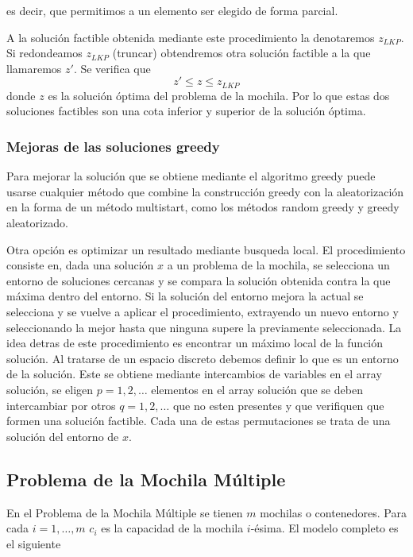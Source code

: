 \noindent es decir, que permitimos a un elemento ser elegido de forma parcial.

\newpage

A la solución factible obtenida mediante este procedimiento la denotaremos $z_{LKP}$. Si redondeamos $z_{LKP}$ (truncar)
obtendremos otra solución factible a la que llamaremos $z'$. Se verifica que
\[
    z' \leq z \leq z_{LKP}
\]
donde $z$ es la solución óptima del problema de la mochila. Por lo que estas dos soluciones factibles son una cota inferior
y superior de la solución óptima.

\subsubsection{Mejoras de las soluciones greedy}

Para mejorar la solución que se obtiene mediante el algoritmo greedy puede usarse cualquier método que combine la 
construcción greedy con la aleatorización en la forma de un método multistart, como los métodos random greedy y greedy 
aleatorizado.

Otra opción es optimizar un resultado mediante busqueda local. El procedimiento consiste en, dada una solución $x$ a un
problema de la mochila, se selecciona un entorno de soluciones cercanas y se compara la solución obtenida contra la que
máxima dentro del entorno. Si la solución del entorno mejora la actual se selecciona y se vuelve a aplicar el procedimiento,
extrayendo un nuevo entorno y seleccionando la mejor hasta que ninguna supere la previamente seleccionada. La idea detras
de este procedimiento es encontrar un máximo local de la función solución. Al tratarse de un espacio discreto debemos definir
lo que es un entorno de la solución. Este se obtiene mediante intercambios de variables en el array solución, se eligen 
$p=1,2,\dots$ elementos en el array solución que se deben intercambiar por otros $q=1,2,\dots$ que no esten presentes y que
verifiquen que formen una solución factible. Cada una de estas permutaciones se trata de una solución del entorno de $x$.

\subsection{Problema de la Mochila Múltiple}

En el Problema de la Mochila Múltiple se tienen $m$ mochilas o contenedores. Para cada $i=1,\dots,m$ $c_i$ es la capacidad
de la mochila $i$-ésima. El modelo completo es el siguiente

